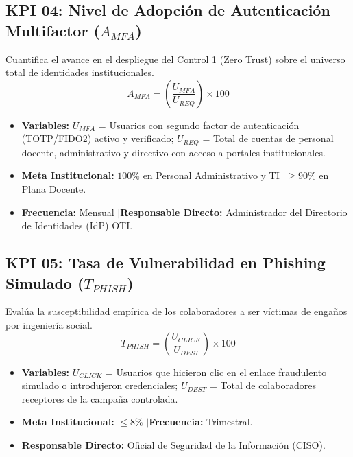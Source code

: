 \subsection{KPI 04: Nivel de Adopción de Autenticación Multifactor \texorpdfstring{($A_{MFA}$)}{(A\_MFA)}}
Cuantifica el avance en el despliegue del Control 1 (Zero Trust) sobre el universo total de identidades institucionales.
\[
A_{MFA} = \left( \frac{U_{MFA}}{U_{REQ}} \right) \times 100
\]
\begin{itemize}[leftmargin=1.5em, itemsep=1pt]
    \item \textbf{Variables:} $U_{MFA}$ = Usuarios con segundo factor de autenticación (TOTP/FIDO2) activo y verificado; $U_{REQ}$ = Total de cuentas de personal docente, administrativo y directivo con acceso a portales institucionales.
    \item \textbf{Meta Institucional:} $100\%$ en Personal Administrativo y TI \quad$\vert$\quad $\ge 90\%$ en Plana Docente.
    \item \textbf{Frecuencia:} Mensual \quad$\vert$\quad \textbf{Responsable Directo:} Administrador del Directorio de Identidades (IdP) OTI.
\end{itemize}

\subsection{KPI 05: Tasa de Vulnerabilidad en Phishing Simulado \texorpdfstring{($T_{PHISH}$)}{(T\_PHISH)}}
Evalúa la susceptibilidad empírica de los colaboradores a ser víctimas de engaños por ingeniería social.
\[
T_{PHISH} = \left( \frac{U_{CLICK}}{U_{DEST}} \right) \times 100
\]
\begin{itemize}[leftmargin=1.5em, itemsep=1pt]
    \item \textbf{Variables:} $U_{CLICK}$ = Usuarios que hicieron clic en el enlace fraudulento simulado o introdujeron credenciales; $U_{DEST}$ = Total de colaboradores receptores de la campaña controlada.
    \item \textbf{Meta Institucional:} $\le 8\%$ \quad$\vert$\quad \textbf{Frecuencia:} Trimestral.
    \item \textbf{Responsable Directo:} Oficial de Seguridad de la Información (CISO).
\end{itemize}

